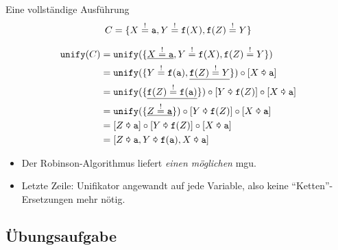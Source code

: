 \documentclass{beamer}
\begin{document}
\begin{frame}{Eine vollständige Ausführung}
  \begin{equation*}
    C = \{ X \stackrel{!}{=} \texttt{a}, Y \stackrel{!}{=} \texttt{f}(X), \texttt{f}(Z) \stackrel{!}{=} Y \}
  \end{equation*}

  \begin{align*}
    \texttt{unify}(C)
    &= \texttt{unify}(\{ \underline{X \plsunify \pa{a}}, Y \plsunify \functor{f}{X}, \functor{f}{Z} \plsunify Y \}) \\
    &= \texttt{unify}(\{ Y \plsunify \functor{f}{\pa{a}}, \underline{\functor{f}{Z} \plsunify Y} \}) \circ \unifier{\su{X}{\pa{a}}} \\
    &= \texttt{unify}(\{ \underline{\functor{f}{Z} \plsunify \functor{f}{\pa{a}}} \}) \circ \unifier{\su{Y}{\functor{f}{Z}}} \circ \unifier{\su{X}{\pa{a}}} \\
    &= \texttt{unify}(\{ \underline{Z \plsunify \pa{a}} \}) \circ \unifier{\su{Y}{\functor{f}{Z}}} \circ \unifier{\su{X}{\pa{a}}} \\
    &= \unifier{\su{Z}{\pa{a}}} \circ \unifier{\su{Y}{\functor{f}{Z}}} \circ \unifier{\su{X}{\pa{a}}} \\
    &= \unifier{\su{Z}{\pa{a}}, \su{Y}{\functor{f}{\pa{a}}}, \su{X}{\pa{a}}}
  \end{align*}

  \begin{itemize}
    \item Der Robinson-Algorithmus liefert \emph{einen möglichen} mgu.
    \item Letzte Zeile: Unifikator angewandt auf jede Variable, also keine \enquote{Ketten}-Ersetzungen mehr nötig.
  \end{itemize}
\end{frame}

\subsection{Übungsaufgabe}
\end{document}
